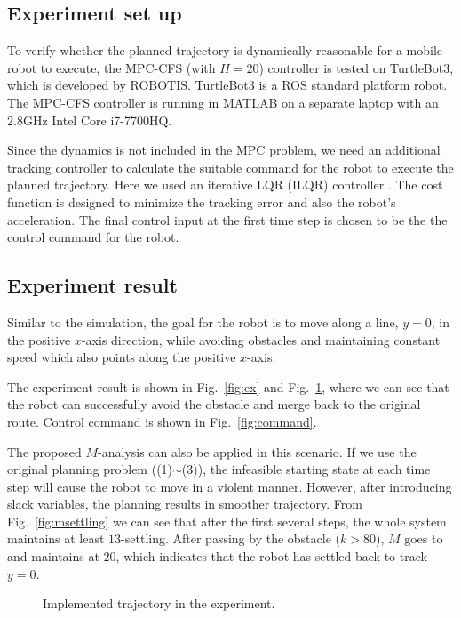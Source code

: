 \documentclass[letterpaper, 10 pt, conference]{ieeeconf}  %
\begin{document}
\subsection{Experiment set up}
To verify whether the planned trajectory is dynamically reasonable for a mobile robot to execute, the MPC-CFS (with $H=20$) controller is tested on TurtleBot3, which is  developed by ROBOTIS. TurtleBot3 is a ROS standard platform robot. The MPC-CFS controller is running in MATLAB on a separate laptop with an 2.8GHz Intel Core i7-7700HQ.

Since the dynamics is not included in the MPC problem, we need an additional tracking controller to calculate the suitable command for the robot to execute the planned trajectory. Here we used an iterative LQR (ILQR) controller \cite{tassa2012synthesis}. The cost function is designed to minimize the tracking error and also the robot's acceleration. The final control input at the first time step is chosen to be the the control command for the robot.

\subsection{Experiment result}
Similar to the simulation, the goal for the robot is to move along a line, $y=0$, in the positive $x$-axis direction, while avoiding obstacles and maintaining constant speed which also points along the positive $x$-axis.

The experiment result is shown in Fig.~\ref{fig:ex} and Fig.~\ref{fig:trajectory}, where we can see that the robot can successfully avoid the obstacle and merge back to the original route. Control command is shown in Fig.~\ref{fig:command}.

The proposed $M$-analysis can also be applied in this scenario. If we use the original planning problem ((1)$\sim$(3)), the infeasible starting state at each time step will cause the robot to move in a violent manner. However, after introducing slack variables, the planning results in smoother trajectory. From Fig.~\ref{fig:msettling} we can see that after the first several steps, the whole system maintains at least $13$-settling. After passing by the obstacle ($k>80$), $M$ goes to and maintains at $20$, which indicates that the robot has settled back to track $y=0$. 


\begin{figure}[t]
      \centering
       
      \caption{ Implemented trajectory in the experiment. }
      \label{fig:trajectory}
\end{figure}
\end{document}
